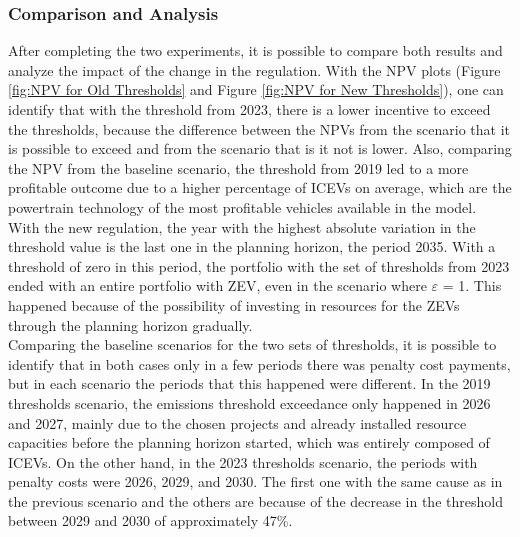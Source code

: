 \subsubsection{Comparison and Analysis}\label{resultexperiment2comparison}
After completing the two experiments, it is possible to compare both results and analyze the impact of the change in the regulation. With the \gls{NPV} plots (Figure \ref{fig:NPV for Old Thresholds} and Figure \ref{fig:NPV for New Thresholds}), one can identify that with the threshold from 2023, there is a lower incentive to exceed the thresholds, because the difference between the \gls{NPV}s from the scenario that it is possible to exceed and from the scenario that is it not is lower. Also, comparing the \gls{NPV} from the baseline scenario, the threshold from 2019 led to a more profitable outcome due to a higher percentage of \gls{ICEV}s on average, which are the powertrain technology of the most profitable vehicles available in the model.\\
With the new regulation, the year with the highest absolute variation in the threshold value is the last one in the planning horizon, the period 2035. With a threshold of zero in this period, the portfolio with the set of thresholds from 2023 ended with an entire portfolio with \gls{ZEV}, even in the scenario where $\varepsilon$ = 1. This happened because of the possibility of investing in resources for the \gls{ZEV}s through the planning horizon gradually.\\
Comparing the baseline scenarios for the two sets of thresholds, it is possible to identify that in both cases only in a few periods there was penalty cost payments, but in each scenario the periods that this happened were different. In the 2019 thresholds scenario, the emissions threshold exceedance only happened in 2026 and 2027, mainly due to the chosen projects and already installed resource capacities before the planning horizon started, which was entirely composed of \gls{ICEV}s. On the other hand, in the 2023 thresholds scenario, the periods with penalty costs were 2026, 2029, and 2030. The first one with the same cause as in the previous scenario and the others are because of the decrease in the threshold between 2029 and 2030 of approximately 47\%.\\


